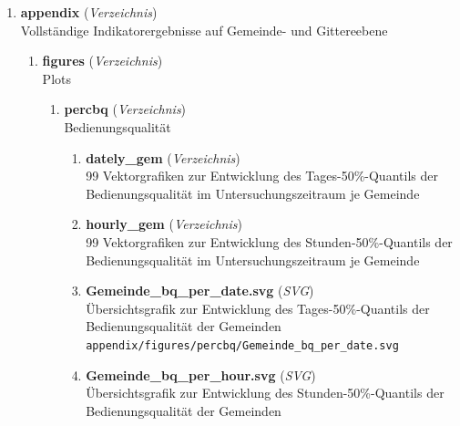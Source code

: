 \begin{enumerate}[label=\arabic*, leftmargin=*, itemsep=0.5em, topsep=0.3em]
\begin{enumerate}[label=\arabic{enumi}.\arabic*, leftmargin=*, itemsep=0.5em, topsep=0.3em]
\texttt{\small output/walk\_20min\_zensus\_stops.csv}
\item \textbf{Bedienungsqualität.gpkg} \textnormal{(\textit{GeoPackage})}\\
Haltestellen mit Variabilitätswerten der BQ im und um das Untersuchungsgebiet, Grundlage für 10\_i2\_traveltimes\\
\texttt{\small output/Bedienungsqualität.gpkg}
\end{enumerate}
\item \textbf{appendix} \textnormal{(\textit{Verzeichnis})}\\
Vollständige Indikatorergebnisse auf Gemeinde- und Gittereebene
\begin{enumerate}[label=\arabic{enumi}.\arabic*, leftmargin=*, itemsep=0.5em, topsep=0.3em]
\item \textbf{figures} \textnormal{(\textit{Verzeichnis})}\\
Plots
\begin{enumerate}[label=\arabic{enumi}.\arabic{enumii}.\arabic*, leftmargin=*, itemsep=0.5em, topsep=0.3em]
\item \textbf{percbq} \textnormal{(\textit{Verzeichnis})}\\
Bedienungsqualität
\begin{enumerate}[label=\arabic{enumi}.\arabic{enumii}.\arabic{enumiii}.\arabic*, leftmargin=*, itemsep=0.5em, topsep=0.3em]
\item \textbf{dately\_gem} \textnormal{(\textit{Verzeichnis})}\\
99 Vektorgrafiken zur Entwicklung des Tages-50\%-Quantils der Bedienungsqualität im Untersuchungszeitraum je Gemeinde
\item \textbf{hourly\_gem} \textnormal{(\textit{Verzeichnis})}\\
99 Vektorgrafiken zur Entwicklung des Stunden-50\%-Quantils der Bedienungsqualität im Untersuchungszeitraum je Gemeinde
\item \textbf{Gemeinde\_bq\_per\_date.svg} \textnormal{(\textit{SVG})}\\
Übersichtsgrafik zur Entwicklung des Tages-50\%-Quantils der Bedienungsqualität der Gemeinden\\
\texttt{\small appendix/figures/percbq/Gemeinde\_bq\_per\_date.svg}
\item \textbf{Gemeinde\_bq\_per\_hour.svg} \textnormal{(\textit{SVG})}\\
Übersichtsgrafik zur Entwicklung des Stunden-50\%-Quantils der Bedienungsqualität der Gemeinden\\

\end{enumerate}
\end{enumerate}
\end{enumerate}
\end{enumerate}
